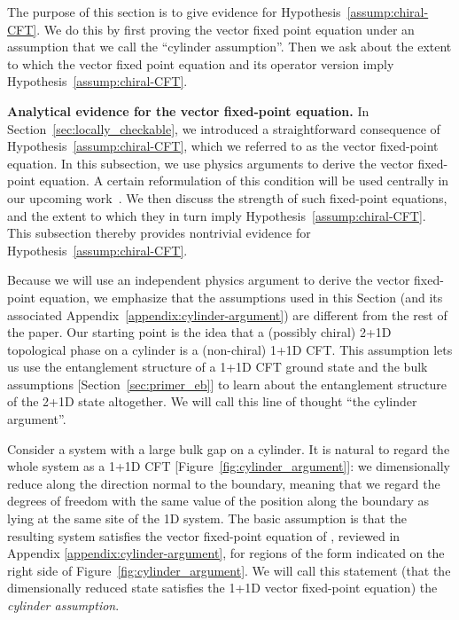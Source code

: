 \documentclass[12pt, nofootinbib]{article}
\theoremstyle{plain}
\theoremstyle{assumption}
\theoremstyle{definition}
\theoremstyle{plain}
\theoremstyle{plain}
\theoremstyle{plain}
\theoremstyle{plain}
\theoremstyle{plain}
\begin{document}
The purpose of this section is to give evidence for Hypothesis~\ref{assump:chiral-CFT}.  We do this by first proving the vector fixed point equation under an assumption that we call the ``cylinder assumption''.   
Then we ask about the extent to which the vector fixed point equation and its operator version imply Hypothesis~\ref{assump:chiral-CFT}. 

{\bf Analytical evidence for the vector fixed-point equation.}
In Section~\ref{sec:locally_checkable}, we introduced a straightforward consequence of Hypothesis~\ref{assump:chiral-CFT}, which we referred to as the vector fixed-point equation. In this subsection, 
we use physics arguments to derive the vector fixed-point equation.
A certain reformulation of this condition will be used centrally in our upcoming work~\cite{q-cross-ratio}. 
We then discuss the strength of such fixed-point equations, and the extent to which they in turn imply Hypothesis~\ref{assump:chiral-CFT}.  
This subsection thereby provides nontrivial evidence for Hypothesis~\ref{assump:chiral-CFT}.

Because we will use an independent physics argument to derive the vector fixed-point equation, we emphasize that the assumptions used in this Section (and its associated Appendix~\ref{appendix:cylinder-argument}) are different from the rest of the paper. Our starting point is the idea that a (possibly chiral) 2+1D topological phase on a cylinder is a (non-chiral) 1+1D CFT. This assumption lets us use the entanglement structure of a 1+1D CFT ground state and the bulk assumptions [Section~\ref{sec:primer_eb}] to learn about the entanglement structure of the 2+1D state altogether.  We will call this line of thought ``the cylinder argument''.

Consider a system with a large bulk gap on a cylinder.  
It is natural to regard the whole system as a 1+1D CFT [Figure~\ref{fig:cylinder_argument}]:
we dimensionally reduce along the direction normal to the boundary, meaning that we regard the degrees of freedom with the same value of the position along the boundary as lying at the same site of the 1D system.  The basic assumption is that the resulting system satisfies the vector fixed-point equation of \cite{Lin2023}, reviewed in Appendix \ref{appendix:cylinder-argument}, for regions of the form indicated on the right side of Figure~\ref{fig:cylinder_argument}.  We will call this statement (that the dimensionally reduced state satisfies the 1+1D vector fixed-point equation) the {\it cylinder assumption}. 
\end{document}
